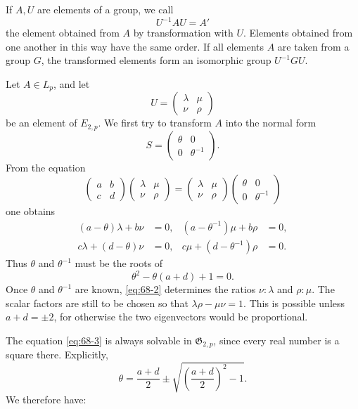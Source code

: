 \documentclass[11pt,a4paper]{book}
\begin{document}
If \(A,U\) are elements of a group, we call
\[
 U^{-1}AU=A'
\]
the element obtained from \(A\) by transformation with \(U\).  Elements obtained from one another in this way have the same order.  If all elements \(A\) are taken from a group \(G\), the transformed elements form an isomorphic group \(U^{-1}GU\).

Let \(A\in L_p\), and let
\[
 U=\begin{pmatrix}\lambda&\mu\\\nu&\rho\end{pmatrix}
\]
be an element of \(E_{2,p}\).  We first try to transform \(A\) into the normal form
\begin{equation}\label{eq:68-1}
 S=\begin{pmatrix}\theta&0\\0&\theta^{-1}\end{pmatrix}.
\end{equation}
From the equation
\[
 \begin{pmatrix}a&b\\c&d\end{pmatrix}
 \begin{pmatrix}\lambda&\mu\\\nu&\rho\end{pmatrix}
 =
 \begin{pmatrix}\lambda&\mu\\\nu&\rho\end{pmatrix}
 \begin{pmatrix}\theta&0\\0&\theta^{-1}\end{pmatrix}
\]
one obtains
\begin{align}
 (a-\theta)\lambda+b\nu&=0,
 &(a-\theta^{-1})\mu+b\rho&=0,\nonumber\\
 c\lambda+(d-\theta)\nu&=0,
 &c\mu+(d-\theta^{-1})\rho&=0.\label{eq:68-2}
\end{align}
Thus \(\theta\) and \(\theta^{-1}\) must be the roots of
\begin{equation}\label{eq:68-3}
 \theta^2-\theta(a+d)+1=0.
\end{equation}
Once \(\theta\) and \(\theta^{-1}\) are known, \eqref{eq:68-2} determines the ratios \(\nu:\lambda\) and \(\rho:\mu\).  The scalar factors are still to be chosen so that \(\lambda\rho-\mu\nu=1\).  This is possible unless \(a+d=\pm2\), for otherwise the two eigenvectors would be proportional.

The equation \eqref{eq:68-3} is always solvable in \(\mathfrak G_{2,p}\), since every real number is a square there.  Explicitly,
\begin{equation}\label{eq:68-5}
 \theta=\frac{a+d}{2}\pm\sqrt{\left(\frac{a+d}{2}\right)^2-1}.
\end{equation}
We therefore have:
\end{document}
